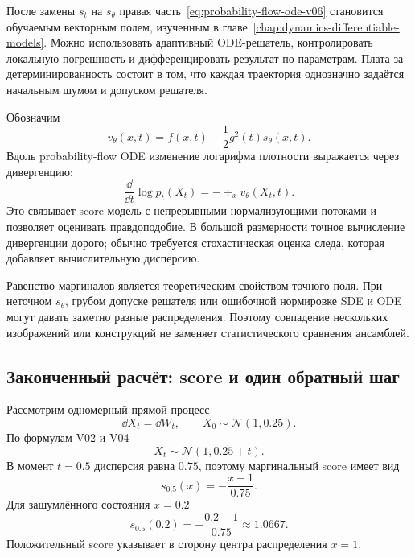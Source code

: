 После замены $s_t$ на $s_\theta$ правая часть~\eqref{eq:probability-flow-ode-v06} становится обучаемым векторным полем, изученным в главе~\ref{chap:dynamics-differentiable-models}. Можно использовать адаптивный ODE-решатель, контролировать локальную погрешность и дифференцировать результат по параметрам. Плата за детерминированность состоит в том, что каждая траектория однозначно задаётся начальным шумом и допуском решателя.

Обозначим
\begin{equation}\label{eq:probability-flow-vector-field-v06}
v_\theta(x,t) = f(x,t) - \frac12 g^2(t)s_\theta(x,t).
\end{equation}
Вдоль probability-flow ODE изменение логарифма плотности выражается через дивергенцию:
\begin{equation}\label{eq:probability-flow-log-density-v06}
\frac{\dd}{\dd t}\log p_t(X_t) = -\div_x v_\theta(X_t,t).
\end{equation}
Это связывает score-модель с непрерывными нормализующими потоками и позволяет оценивать правдоподобие. В большой размерности точное вычисление дивергенции дорого; обычно требуется стохастическая оценка следа, которая добавляет вычислительную дисперсию.

Равенство маргиналов является теоретическим свойством точного поля. При неточном $s_\theta$, грубом допуске решателя или ошибочной нормировке SDE и ODE могут давать заметно разные распределения. Поэтому совпадение нескольких изображений или конструкций не заменяет статистического сравнения ансамблей.

\subsection{Законченный расчёт: score и один обратный шаг}

Рассмотрим одномерный прямой процесс
\begin{equation}\label{eq:ve-calculation-forward-v06}
\dd X_t=\dd W_t, \qquad X_0\sim\mathcal N(1,0.25).
\end{equation}
По формулам V02 и V04
\begin{equation}\label{eq:ve-calculation-marginal-v06}
X_t\sim\mathcal N(1,0.25+t).
\end{equation}
В момент $t=0.5$ дисперсия равна $0.75$, поэтому маргинальный score имеет вид
\begin{equation}\label{eq:ve-calculation-score-v06}
s_{0.5}(x) = -\frac{x-1}{0.75}.
\end{equation}
Для зашумлённого состояния $x=0.2$
\begin{equation}\label{eq:ve-calculation-score-value-v06}
s_{0.5}(0.2) = -\frac{0.2-1}{0.75} \approx1.0667.
\end{equation}
Положительный score указывает в сторону центра распределения $x=1$.

